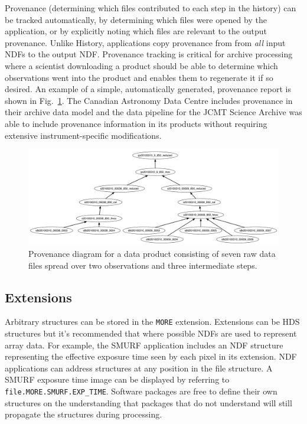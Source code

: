 \documentclass[11pt,twoside]{article}
\begin{document}
Provenance (determining which files contributed to each step in the
history) can be tracked automatically, by determining which files were
opened by the application, or by explicitly noting which files are
relevant to the output provenance. Unlike History, applications copy
provenance from from \emph{all} input NDFs to the output
NDF. Provenance tracking is critical for archive processing where a
scientist downloading a product should be able to determine which
observations went into the product and enables them to regenerate it
if so desired. An example of a simple, automatically generated,
provenance report is shown in Fig.\ \ref{fig:P91_f1}. The Canadian
Astronomy Data Centre includes provenance in their archive data model
\citep[CAOM;][]{2012ASPC..461..339D,P25_adassxxii} and the data
pipeline for the JCMT Science Archive \citep{2008ASPC..394..565J} was
able to include provenance information in its products without
requiring extensive instrument-specific modifications.

\begin{figure}
\includegraphics[width=\textwidth]{P91_f1}
\caption{Provenance diagram for a data product consisting of seven raw
  data files spread over two observations and three intermediate steps.}
\label{fig:P91_f1}
\end{figure}

\subsection{Extensions}

Arbitrary structures can be stored in the \texttt{MORE}
extension. Extensions can be HDS structures but it's recommended that
where possible NDFs are used to represent array data. For example, the
SMURF application includes an NDF structure representing the effective
exposure time seen by each pixel in its extension. NDF applications
can address structures at any position in the file structure. A SMURF
exposure time image can be displayed by referring to
\texttt{file.MORE.SMURF.EXP\_TIME}. Software packages are free to
define their own structures on the understanding that packages that do
not understand will still propagate the structures during processing.
\end{document}
